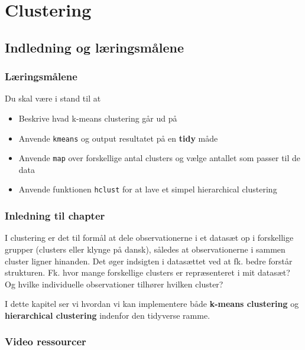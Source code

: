 \documentclass[
]{book}
\providecommand{\tightlist}{%
  \setlength{\itemsep}{0pt}\setlength{\parskip}{0pt}}
\begin{document}
\hypertarget{clustering}{%
\chapter{Clustering}\label{clustering}}

\hypertarget{indledning-og-luxe6ringsmuxe5lene-2}{%
\section{Indledning og læringsmålene}\label{indledning-og-luxe6ringsmuxe5lene-2}}

\hypertarget{luxe6ringsmuxe5lene-4}{%
\subsection{Læringsmålene}\label{luxe6ringsmuxe5lene-4}}

Du skal være i stand til at

\begin{itemize}
\tightlist
\item
  Beskrive hvad k-means clustering går ud på
\item
  Anvende \texttt{kmeans} og output resultatet på en \textbf{tidy} måde
\item
  Anvende \texttt{map} over forskellige antal clusters og vælge antallet som passer til de data
\item
  Anvende funktionen \texttt{hclust} for at lave et simpel hierarchical clustering
\end{itemize}

\hypertarget{inledning-til-chapter}{%
\subsection{Inledning til chapter}\label{inledning-til-chapter}}

I clustering er det til formål at dele observationerne i et datasæt op i forskellige grupper (clusters eller klynge på dansk), således at observationerne i sammen cluster ligner hinanden. Det øger indsigten i datasættet ved at fk. bedre forstår strukturen. Fk. hvor mange forskellige clusters er repræsenteret i mit datasæt? Og hvilke individuelle observationer tilhører hvilken cluster?

I dette kapitel ser vi hvordan vi kan implementere både \textbf{k-means clustering} og \textbf{hierarchical clustering} indenfor den tidyverse ramme.

\hypertarget{video-ressourcer-5}{%
\subsection{Video ressourcer}\label{video-ressourcer-5}}
\end{document}
